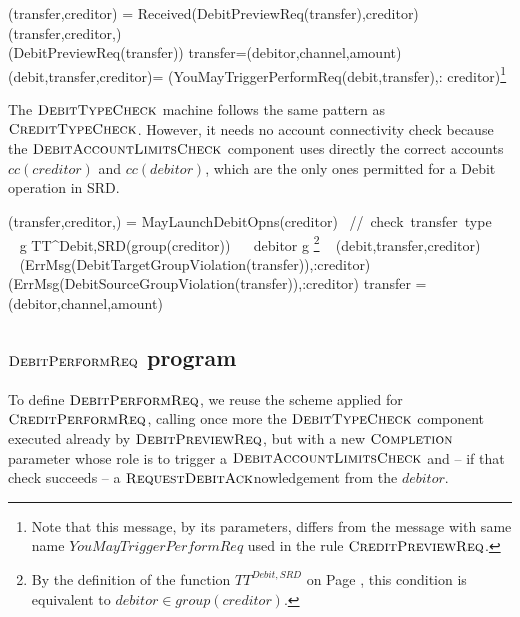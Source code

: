 \begin{asm}
(transfer,creditor)  =\+
  \IF Received(DebitPreviewReq(transfer),\FROM creditor) \THEN \+   
      (transfer,creditor,)\\
      (DebitPreviewReq(transfer)) \-
\WHERE \+
transfer=(debitor,channel,amount)\\
(debit,transfer,creditor)=\+
(YouMayTriggerPerformReq(debit,transfer),\TO : creditor)\footnote{Note that this message,  by its parameters, differs from the message with same name $YouMayTriggerPerformReq$ used in the rule $\hbox{\sc CreditPreviewReq}$.}
\end{asm}

The $\hbox{\sc DebitTypeCheck}$ machine follows the same pattern as $\hbox{\sc CreditTypeCheck}$. However, it needs no account connectivity check because the $\hbox{\sc DebitAccountLimitsCheck}$ component uses directly the correct accounts  $cc(creditor)$ and $cc(debitor)$, which are the only ones permitted for a Debit operation in SRD.


\begin{asm}
(transfer,creditor,)  =\+
\IF MayLaunchDebitOpns(creditor) \mbox{  // check transfer type}\+
  \THEN ~ \IF  ~ \FORSOME g \in TT^{Debit,SRD}(group(creditor)) 
          ~~ debitor \in g \footnote{By the definition of the function $TT^{Debit,SRD}$ on Page \pageref{debitdomaindef}, this condition is equivalent to $debitor \in group(creditor)$.} \+
       \THEN  ~ (debit,transfer,creditor) \\
        \ELSE ~ 
        (ErrMsg(DebitTargetGroupViolation(transfer)),\TO :creditor) \- 
  \ELSE ~ 
  (ErrMsg(DebitSourceGroupViolation(transfer)),\TO :creditor)\-
 \WHERE \+
   transfer = (debitor,channel,amount) 
\end{asm}



\subsection{$\hbox{\sc DebitPerformReq}$ program}
\label{sect:debitperform}

To define $\hbox{\sc DebitPerformReq}$, we reuse the scheme applied for $\hbox{\sc CreditPerformReq}$, calling once more the $\hbox{\sc DebitTypeCheck}$ component executed already by $\hbox{\sc DebitPreviewReq}$, but with a new $\hbox{\sc Completion}$ parameter whose role is to trigger a $\hbox{\sc DebitAccountLimitsCheck}$ and -- if that check succeeds -- a $\hbox{\sc RequestDebitAck}$nowledgement from the $debitor$.   

